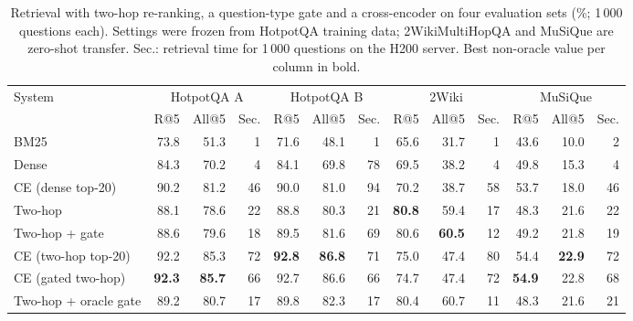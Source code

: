 \begin{table}[t]
\centering
\footnotesize
\caption{Retrieval with two-hop re-ranking, a question-type gate and a cross-encoder on four evaluation sets (\%; 1\,000 questions each). Settings were frozen from HotpotQA training data; 2WikiMultiHopQA and MuSiQue are zero-shot transfer. Sec.: retrieval time for 1\,000 questions on the H200 server. Best non-oracle value per column in bold.}
\label{tab:ext}
\begin{tabular}{lrrrrrrrrrrrr}
\toprule
System & \multicolumn{3}{c}{HotpotQA A} & \multicolumn{3}{c}{HotpotQA B} & \multicolumn{3}{c}{2Wiki} & \multicolumn{3}{c}{MuSiQue} \\
& R@5 & All@5 & Sec. & R@5 & All@5 & Sec. & R@5 & All@5 & Sec. & R@5 & All@5 & Sec. \\
\midrule
BM25 & 73.8 & 51.3 & 1 & 71.6 & 48.1 & 1 & 65.6 & 31.7 & 1 & 43.6 & 10.0 & 2 \\
Dense & 84.3 & 70.2 & 4 & 84.1 & 69.8 & 78 & 69.5 & 38.2 & 4 & 49.8 & 15.3 & 4 \\
\midrule
CE (dense top-20) & 90.2 & 81.2 & 46 & 90.0 & 81.0 & 94 & 70.2 & 38.7 & 58 & 53.7 & 18.0 & 46 \\
Two-hop & 88.1 & 78.6 & 22 & 88.8 & 80.3 & 21 & \textbf{80.8} & 59.4 & 17 & 48.3 & 21.6 & 22 \\
Two-hop + gate & 88.6 & 79.6 & 18 & 89.5 & 81.6 & 69 & 80.6 & \textbf{60.5} & 12 & 49.2 & 21.8 & 19 \\
\midrule
CE (two-hop top-20) & 92.2 & 85.3 & 72 & \textbf{92.8} & \textbf{86.8} & 71 & 75.0 & 47.4 & 80 & 54.4 & \textbf{22.9} & 72 \\
CE (gated two-hop) & \textbf{92.3} & \textbf{85.7} & 66 & 92.7 & 86.6 & 66 & 74.7 & 47.4 & 72 & \textbf{54.9} & 22.8 & 68 \\
Two-hop + oracle gate & 89.2 & 80.7 & 17 & 89.8 & 82.3 & 17 & 80.4 & 60.7 & 11 & 48.3 & 21.6 & 21 \\
\bottomrule
\end{tabular}
\end{table}